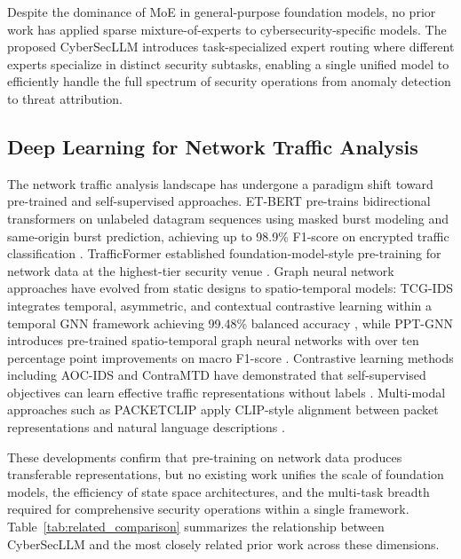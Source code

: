 \documentclass[journal]{IEEEtran}
\newcommand{\modelname}{CyberSecLLM}
\begin{document}
Despite the dominance of MoE in general-purpose foundation models, no prior work has applied sparse mixture-of-experts to cybersecurity-specific models. The proposed \modelname{} introduces task-specialized expert routing where different experts specialize in distinct security subtasks, enabling a single unified model to efficiently handle the full spectrum of security operations from anomaly detection to threat attribution.

\subsection{Deep Learning for Network Traffic Analysis}
\label{subsec:traffic_dl}

The network traffic analysis landscape has undergone a paradigm shift toward pre-trained and self-supervised approaches. ET-BERT pre-trains bidirectional transformers on unlabeled datagram sequences using masked burst modeling and same-origin burst prediction, achieving up to 98.9\% F1-score on encrypted traffic classification \cite{lin2022etbert}. TrafficFormer established foundation-model-style pre-training for network data at the highest-tier security venue \cite{trafficformer2025}. Graph neural network approaches have evolved from static designs to spatio-temporal models: TCG-IDS integrates temporal, asymmetric, and contextual contrastive learning within a temporal GNN framework achieving 99.48\% balanced accuracy \cite{tcgids2025}, while PPT-GNN introduces pre-trained spatio-temporal graph neural networks with over ten percentage point improvements on macro F1-score \cite{pptgnn2024}. Contrastive learning methods including AOC-IDS and ContraMTD have demonstrated that self-supervised objectives can learn effective traffic representations without labels \cite{aocids2024, contramtd2024}. Multi-modal approaches such as PACKETCLIP apply CLIP-style alignment between packet representations and natural language descriptions \cite{packetclip2025}.

These developments confirm that pre-training on network data produces transferable representations, but no existing work unifies the scale of foundation models, the efficiency of state space architectures, and the multi-task breadth required for comprehensive security operations within a single framework. Table~\ref{tab:related_comparison} summarizes the relationship between \modelname{} and the most closely related prior work across these dimensions.
\end{document}
